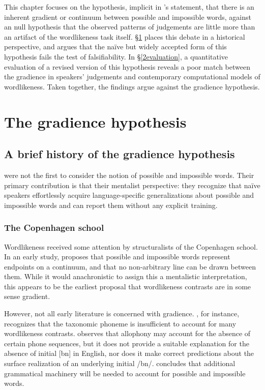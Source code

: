 This chapter focuses on the hypothesis, implicit in \citeauthor{Shademan2006}'s statement, that there is an inherent gradient or continuum between possible and impossible words, against an null hypothesis that the observed patterns of judgements are little more than an artifact of the wordlikeness task itself. \S\ref{gradhyp} places this debate in a historical perspective, and argues that the naïve but widely accepted form of this hypothesis fails the test of falsifiability. In \S\ref{2evaluation}, a quantitative evaluation of a revised version of this hypothesis reveals a poor match between the gradience in speakers' judgements and contemporary computational models of wordlikeness. Taken together, the findings argue against the gradience hypothesis.


\section{The gradience hypothesis} \label{gradhyp}

\subsection{A brief history of the gradience hypothesis} \label{history}

\citeauthor{Chomsky1965} were not the first to consider the notion of possible and impossible words. Their primary contribution is that their mentalist perspective: they recognize that naïve speakers effortlessly acquire language-specific generalizations about possible and impossible words and can report them without any explicit training.

\subsubsection{The Copenhagen school}

Wordlikeness received some attention by structuralists of the Copenhagen school. In an early study, \citet{Fischer-Jorgensen1952} proposes that possible and impossible words represent endpoints on a continuum, and that no non-arbitrary line can be drawn between them. While it would anachronistic to assign this a mentalistic interpretation, this appears to be the earliest proposal that wordlikeness contrasts are in some sense gradient. 

However, not all early literature is concerned with gradience. \citet[][31]{Vogt1954}, for instance, recognizes that the taxonomic phoneme is insufficient to account for many wordlikeness contrasts. \citeauthor{Vogt1954} observes that allophony may account for the absence of certain phone sequences, but it does not provide a suitable explanation for the absence of initial [bn] in English, nor does it make correct predictions about the surface realization of an underlying initial /bn/. \citeauthor{Vogt1954} concludes that additional grammatical machinery will be needed to account for possible and impossible words. 

